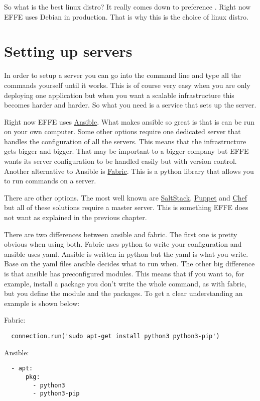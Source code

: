 So what is the best linux distro? It really comes down to preference \cite{bestLinuxDistro}. Right now EFFE uses Debian in production. That is why this is the choice of linux distro.

\section{Setting up servers}

In order to setup a server you can go into the command line and type all the commands yourself until it works. This is of course very easy when you are only deploying one application but when you want a scalable infrastructure this becomes harder and harder. So what you need is a service that sets up the server.

Right now EFFE uses \href{https://www.ansible.com/}{Ansible}. What makes ansible so great is that is can be run on your own computer. Some other options require one dedicated server that handles the configuration of all the servers. This means that the infrastructure gets bigger and bigger. That may be important to a bigger company but EFFE wants its server configuration to be handled easily but with version control. Another alternative to Ansible is \href{http://www.fabfile.org/}{Fabric}. This is a python library that allows you to run commands on a server.

There are other options. The most well known are \href{https://www.saltstack.com/}{SaltStack}, \href{https://puppet.com/}{Puppet} and \href{https://www.chef.io/}{Chef} but all of these solutions require a master server. This is something EFFE does not want as explained in the previous chapter.

There are two differences between ansible and fabric. The first one is pretty obvious when using both. Fabric uses python to write your configuration and ansible uses yaml. Ansible is written in python but the yaml is what you write. Base on the yaml files ansible decides what to run when. The other big difference is that ansible has preconfigured modules. This means that if you want to, for example, install a package you don't write the whole command, as with fabric, but you define the module and the packages. To get a clear understanding an example is shown below:

Fabric:
\begin{verbatim}
  connection.run('sudo apt-get install python3 python3-pip')
\end{verbatim}

Ansible:
\begin{verbatim}
  - apt:
      pkg:
        - python3
        - python3-pip
\end{verbatim}

